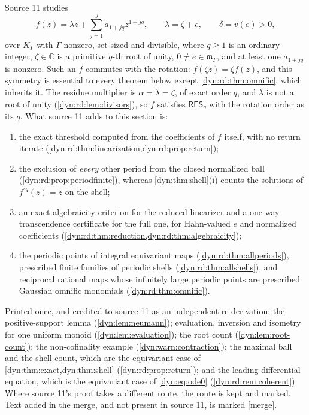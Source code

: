 \documentclass[11pt,letterpaper]{article}
\theoremstyle{definition}
\theoremstyle{remark}
\newcommand{\C}{\mathbb C}
\newcommand{\m}{\mathfrak m}
\newcommand{\resq}{\mathsf{RES}_q}
\newcommand{\mergetag}{\textup{\textsf{\small[merge]}}}%
\numberwithin{equation}{section}
\begin{document}
Source 11 studies
\begin{equation}\label{dyn:rd:eq:family}
 f(z)=\lambda z+\sum_{j=1}^{J}a_{1+jq}z^{1+jq},\qquad
 \lambda=\zeta+e,\qquad \delta=v(e)>0,
\end{equation}
over $K_\Gamma$ with $\Gamma$ nonzero, set-sized and divisible, where $q\ge1$
is an ordinary integer, $\zeta\in\C$ is a primitive $q$-th root of unity,
$0\ne e\in\m_\Gamma$, and at least one $a_{1+jq}$ is nonzero. Such an $f$
commutes with the rotation: $f(\zeta z)=\zeta f(z)$, and this symmetry is
essential to every theorem below except \cref{dyn:rd:thm:omnific}, which
inherits it. The residue multiplier is $\alpha=\bar\lambda=\zeta$, of exact
order $q$, and $\lambda$ is not a root of unity
(\cref{dyn:rd:lem:divisors}), so $f$ satisfies $\resq$ with the rotation
order as its $q$. What source 11 adds to this section is:
\begin{enumerate}[label=(\alph*)]
\item the exact threshold computed from the coefficients of $f$ itself, with
no return iterate (\cref{dyn:rd:thm:linearization,dyn:rd:prop:return});
\item the exclusion of \emph{every} other period from the closed normalized
ball (\cref{dyn:rd:prop:periodfinite}), whereas \cref{dyn:thm:shell}(i)
counts the solutions of $f^{\circ q}(z)=z$ on the shell;
\item an exact algebraicity criterion for the reduced linearizer and a
one-way transcendence certificate for the full one, for Hahn-valued $e$ and
normalized coefficients (\cref{dyn:rd:thm:reduction,dyn:rd:thm:algebraicity});
\item the periodic points of integral equivariant maps
(\cref{dyn:rd:thm:allperiods}), prescribed finite families of periodic
shells (\cref{dyn:rd:thm:allshells}), and reciprocal rational maps whose
infinitely large periodic points are prescribed Gaussian omnific monomials
(\cref{dyn:rd:thm:omnific}).
\end{enumerate}
Printed once, and credited to source 11 as an independent re-derivation:
the positive-support lemma (\cref{dyn:lem:neumann}); evaluation, inversion
and isometry for one uniform monoid (\cref{dyn:lem:evaluation}); the root
count (\cref{dyn:lem:root-count}); the non-cofinality example
(\cref{dyn:warn:contraction}); the maximal ball and the shell count, which
are the equivariant case of \cref{dyn:thm:exact,dyn:thm:shell}
(\cref{dyn:rd:prop:return}); and the leading differential equation, which
is the equivariant case of \eqref{dyn:eq:ode0}
(\cref{dyn:rd:rem:coherent}). Where source 11's proof takes a different
route, the route is kept and marked. Text added in the merge, and not
present in source 11, is marked \mergetag.
\end{document}
